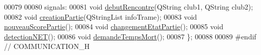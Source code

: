 \begin{DoxyCode}
00079 
00080 signals:
00081     \textcolor{keywordtype}{void} \hyperlink{class_communication_af3430c844d728e4ec3961744243324e1}{debutRencontre}(QString club1, QString club2);
00082     \textcolor{keywordtype}{void} \hyperlink{class_communication_a3d8a1dccee9867e6b84932ddc3072b45}{creationPartie}(QStringList infoTrame);
00083     \textcolor{keywordtype}{void} \hyperlink{class_communication_acf4446d47652e0c508296e52df6fb11b}{nouveauScorePartie}();
00084     \textcolor{keywordtype}{void} \hyperlink{class_communication_af5444d470230a6e817ca8bc9484eb169}{changementEtatPartie}();
00085     \textcolor{keywordtype}{void} \hyperlink{class_communication_a4c828450e0ff92818c878ee28f240662}{detectionNET}();
00086     \textcolor{keywordtype}{void} \hyperlink{class_communication_ab2dd9f10ceaba18016017104683b6fc1}{demandeTempsMort}();
00087 \};
00088 
00089 \textcolor{preprocessor}{#endif // COMMUNICATION\_H}
\end{DoxyCode}
